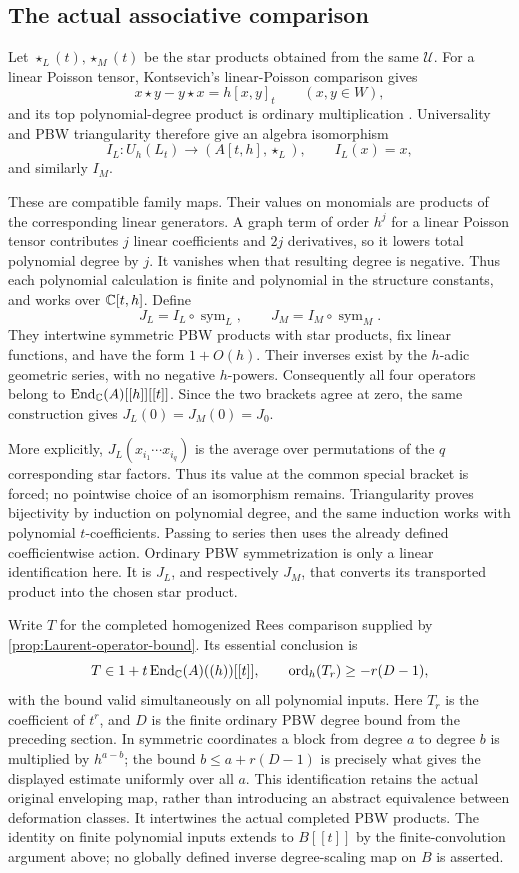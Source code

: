 \subsection*{The actual associative comparison}

Let $\star_L(t),\star_M(t)$ be the star products obtained from the
same $\mathcal U$.  For a linear Poisson tensor, Kontsevich's
linear-Poisson comparison gives
\[
 x\star y-y\star x=h[x,y]_t\qquad(x,y\in W),
\]
and its top polynomial-degree product is ordinary multiplication
\cite[\S8.3.1 of the arXiv version]{Kontsevich2003}.  Universality and PBW triangularity
therefore give an algebra isomorphism
\[
 I_L:U_h(L_t)\longrightarrow(A[t,h],\star_L),
 \qquad I_L(x)=x,
\]
and similarly $I_M$.

These are compatible family maps.  Their values on monomials are
products of the corresponding linear generators.  A graph term of
order $h^j$ for a linear Poisson tensor contributes $j$ linear
coefficients and $2j$ derivatives, so it lowers total polynomial
degree by $j$.  It vanishes when that resulting degree is negative.
Thus each polynomial calculation is finite and polynomial in the
structure constants, and works over $\mathbb C[t,h]$.  Define
\[
 J_L=I_L\circ\operatorname{sym}_L,\qquad
 J_M=I_M\circ\operatorname{sym}_M.
\]
They intertwine symmetric PBW products with star products, fix linear
functions, and have the form $1+O(h)$.  Their inverses exist by
the $h$-adic geometric series, with no negative $h$-powers.
Consequently all four operators belong to
$\operatorname{End}_{\mathbb C}(A)[[h]][[t]]$.  Since the two brackets agree at zero,
the same construction gives $J_L(0)=J_M(0)=J_0$.

More explicitly, $J_L(x_{i_1}\cdots x_{i_q})$ is the average over
permutations of the $q$ corresponding star factors.  Thus its value
at the common special bracket is forced; no pointwise choice of an
isomorphism remains.  Triangularity proves bijectivity by induction
on polynomial degree, and the same induction works with polynomial
$t$-coefficients.  Passing to series then uses the already defined
coefficientwise action.  Ordinary PBW symmetrization is only a linear
identification here.  It is $J_L$, and respectively $J_M$, that
converts its transported product into the chosen star product.

Write $T$ for the completed homogenized Rees comparison supplied by
\cref{prop:Laurent-operator-bound}.  Its essential conclusion is
\[
 T\in1+t\operatorname{End}_{\mathbb C}(A)((h))[[t]],\qquad
 \operatorname{ord}_{h}(T_r)\ge-r(D-1),
\]
with the bound valid simultaneously on all polynomial inputs.
Here $T_r$ is the coefficient of $t^r$, and $D$ is the finite
ordinary PBW degree bound from the preceding section.  In symmetric
coordinates a block from degree $a$ to degree $b$ is multiplied by
$h^{a-b}$; the bound $b\le a+r(D-1)$ is precisely what gives the
displayed estimate uniformly over all $a$.  This identification
retains the actual original enveloping map, rather than introducing
an abstract equivalence between deformation classes.  It intertwines
the actual completed PBW products.  The identity on
finite polynomial inputs extends to $B[[t]]$ by the finite-convolution
argument above; no globally defined inverse degree-scaling map on
$B$ is asserted.

